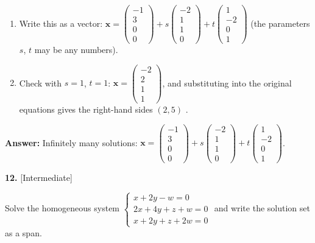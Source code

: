 \documentclass[11pt]{article}
\begin{document}
\begin{tcolorbox}[breakable,colback=ans,colframe=ansb,boxrule=0.5pt,left=4pt,right=4pt,top=2pt,bottom=2pt]
\begin{enumerate}[leftmargin=2.2em,itemsep=1pt,topsep=1pt,label=\textbf{Step \arabic*.}]
\item Write this as a vector: $\displaystyle \mathbf x=\begin{pmatrix}-1\\3\\0\\0\end{pmatrix}+s\begin{pmatrix}-2\\1\\1\\0\end{pmatrix}+t\begin{pmatrix}1\\-2\\0\\1\end{pmatrix}$ (the parameters $s$, $t$ may be any numbers).
\item Check with $s=1$, $t=1$: $\mathbf x=\begin{pmatrix}-2\\2\\1\\1\end{pmatrix}$, and substituting into the original equations gives the right-hand sides $(2,5)$ \checkmark.
\end{enumerate}\textbf{Answer:} Infinitely many solutions: $\mathbf x=\begin{pmatrix}-1\\3\\0\\0\end{pmatrix}+s\begin{pmatrix}-2\\1\\1\\0\end{pmatrix}+t\begin{pmatrix}1\\-2\\0\\1\end{pmatrix}$.\end{tcolorbox}
\par\vspace{2pt}
\begin{minipage}{\linewidth}\textbf{12.} \hfill{\scriptsize\color{ink}[Intermediate]}\par\nopagebreak Solve the homogeneous system $\begin{cases}x+2y-w=0\\ 2x+4y+z+w=0\\ x+2y+z+2w=0\end{cases}$ and write the solution set as a span.
\end{minipage}\par\nopagebreak
\end{document}
